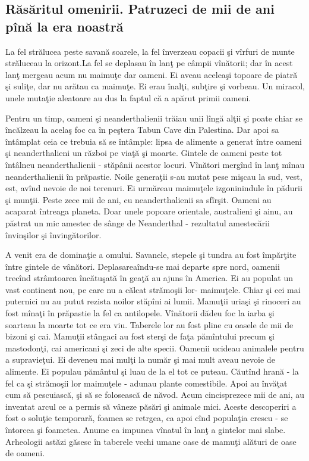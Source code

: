 \subsection{Răsăritul omenirii. Patruzeci de mii de ani pînă la era noastră}
La fel strălucea peste savană soarele, la fel înverzeau copacii şi vîrfuri de munte străluceau la orizont.La fel se deplasau în lanţ pe câmpii vînătorii; dar în acest lanţ mergeau acum nu maimuţe dar oameni. Ei aveau aceleaşi topoare de piatră şi suliţe, dar nu arătau ca maimuţe. Ei erau înalţi, subţire şi vorbeau. Un miracol, unele mutaţie aleatoare au dus la faptul că a apărut primii oameni. 

Pentru un timp, oameni şi neanderthalienii trăiau unii lîngă alţii şi poate chiar se încălzeau la acelaş foc ca în peştera Tabun Cave din Palestina. Dar apoi sa întâmplat ceia ce trebuia să se întâmple: lipsa de alimente a generat între oameni şi neanderthalieni un război pe viaţă şi moarte. Gintele de oameni peste tot întâlneu neanderthalienii - stăpânii acestor locuri. Vînători mergînd în lanţ mînau neanderthalienii în prăpastie. Noile generaţii s-au mutat pese mişcau la sud, vest, est, avînd nevoie de noi terenuri. Ei urmăreau maimuţele izgoninindule în pădurii şi munţii. Peste zece mii de ani, cu neanderthalienii sa sfîrşit. Oameni au acaparat întreaga planeta. Doar unele popoare orientale, australieni şi ainu, au păstrat un mic amestec de sânge de Neanderthal - rezultatul amestecării învinşilor şi învingătorilor. 

A venit era de dominaţie a omului. Savanele, stepele şi tundra au fost împărţite între gintele de vânători. Deplasareaîndu-se mai departe spre nord, oamenii trecînd strâmtoarea încătuşată în geaţă au ajuns în America. Ei au populat un vast continent nou, pe care nu a călcat strămoşii lor- maimuţele. Chiar şi cei mai puternici nu au putut rezista noilor stăpîni ai lumii. Mamuţii uriaşi şi rinoceri au fost mînaţi în prăpastie la fel ca antilopele. Vînătorii dădeu foc la iarba şi soarteau la moarte tot ce era viu. Taberele lor au fost pline cu oasele de mii de bizoni şi cai. Mamuţii stângaci au fost sterşi de faţa pămîntului precum şi mastodonţi, cai americani şi zeci de alte specii. Oamenii ucideau animalele pentru a supravieţui. Ei deveneu mai mulţi la număr şi mai mult aveau nevoie de alimente. Ei populau pământul şi luau de la el tot ce puteau. Căutînd hrană - la fel ca şi strămoşii lor maimuţele - adunau plante comestibile. Apoi au învăţat cum să pescuiască, şi să se folosească de  năvod. Acum cincisprezece mii de ani, au inventat arcul ce a permis să vâneze păsări şi animale mici. Aceste descoperiri a fost o soluţie temporară, foamea se retrgea, ca apoi cînd populaţia crescu - se întorcea şi foametea. Anume ea impunea vînatul în lanţ a gintelor mai slabe. Arheologii astăzi găsesc în taberele vechi umane oase de mamuţi alături de oase de oameni. 

